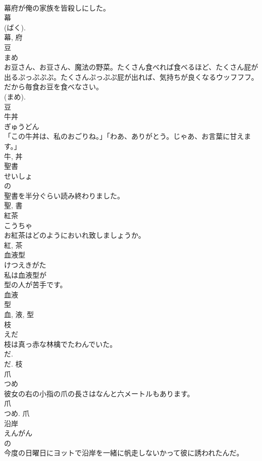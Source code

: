 \documentclass[8pt]{extreport}
\begin{document}
\begin{CJK}{UTF8}{min}
\\	幕府が俺の家族を皆殺しにした。	
\\	幕 
\\	(ばく). 
\\	幕, 府	
\\	豆	
\\	まめ	
\\	お豆さん、お豆さん、魔法の野菜。たくさん食べれば食べるほど、たくさん屁が出るぷっぷぷぷ。たくさんぷっぷぷ屁が出れば、気持ちが良くなるウッフフフ。だから毎食お豆を食べなさい。	
\\	(まめ).
\\	豆	
\\	牛丼	
\\	ぎゅうどん	
\\	「この牛丼は、私のおごりね。」「わあ、ありがとう。じゃあ、お言葉に甘えます。」	
\\	牛, 丼	
\\	聖書	
\\	せいしょ	
\\	の 
\\	聖書を半分ぐらい読み終わりました。	
\\	聖, 書	
\\	紅茶	
\\	こうちゃ	
\\	お紅茶はどのようにおいれ致しましょうか。	
\\	紅, 茶	
\\	血液型	
\\	けつえきがた	
\\	私は血液型が
\\	型の人が苦手です。	
\\	血液 
\\	型 
\\	血, 液, 型	
\\	枝	
\\	えだ	
\\	枝は真っ赤な林檎でたわんでいた。	
\\	だ. 
\\	だ.	枝	
\\	爪	
\\	つめ	
\\	彼女の右の小指の爪の長さはなんと六メートルもあります。	
\\	爪 
\\	つめ.	爪	
\\	沿岸	
\\	えんがん	
\\	の 
\\	今度の日曜日にヨットで沿岸を一緒に帆走しないかって彼に誘われたんだ。	

\end{CJK}
\end{document}
